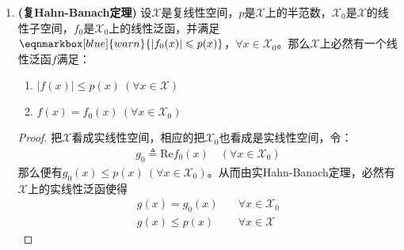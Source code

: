 \begin{enumerate}[leftmargin=2cm, label=\arabic*]
\begin{proof}
			于是$\mathscr{F}$成为一个半序集，又设$M$是$\mathscr{F}$中的任一个全序子集，令
			\begin{align*}
				\mathscr{X}_M \triangleq \bigcup\limits_{(\mathscr{X}_{\Delta},f_{\Delta})\in M} \{\mathscr{X}_{\Delta}\}
			\end{align*}
			以及
			\begin{align*}
				f_M(x) = f_{\Delta}(x),\quad \forall x\in\mathscr{X}_{\Delta},\ (\mathscr{X}_{\Delta},f_{\Delta})\in M
			\end{align*}
			由于$M$是全序子集，容易验证$\mathscr{X}$是包含$\mathscr{X}_0$的子空间，且$f_M$在$\mathscr{X}_M$上是唯一确定的，满足$f_M(x)\leqslant p(x)$，于是$(\mathscr{X}_M,f_M)\in\mathscr{F}$并且是$M$的一个上界。由Zorn引理，$\mathscr{F}$本身存在极大元，记为$(\mathscr{X}_A,f_A)$。
			
			最后我们证明$\mathscr{X}_A = \mathscr{X}$，用反证法，若不然则可以构造出$(\Tilde{\mathscr{X}}_A,\Tilde{f}_A)\in\mathscr{F}$，与极大性矛盾。故而所求的$f$即为$f_A$。
		\end{proof}
		\item \textbf{(复Hahn-Banach定理)} 设$\mathscr{X}$是复线性空间，$p$是$\mathscr{X}$上的半范数，$\mathscr{X}_0$是$\mathscr{X}$的线性子空间，$f_0$是$\mathscr{X}_0$上的线性泛函，并满足$\eqnmarkbox[blue]{warn}{|f_0(x)| \leqslant p(x)}$，$\forall x\in \mathscr{X}_0$。那么$\mathscr{X}$上必然有一个线性泛函$f$满足：
		\vspace{1em}
		
		\begin{enumerate}[leftmargin=1cm, label=(\arabic*)]
			\item $|f(x)|\leqslant p(x)\ (\forall x\in\mathscr{X})$
			\item $f(x) = f_0(x)\ (\forall x\in\mathscr{X}_0)$
		\end{enumerate}
		\begin{proof}
			把$\mathscr{X}$看成实线性空间，相应的把$\mathscr{X}_0$也看成是实线性空间，令：
			\begin{align*}
				g_0\triangleq \text{Re} f_0(x) \quad (\forall x\in\mathscr{X}_0)
			\end{align*}
			那么便有$g_0(x)\leqslant p(x)\ (\forall x\in\mathscr{X}_0)$。从而由实Hahn-Banach定理，必然有$\mathscr{X}$上的实线性泛函使得
			\begin{align*}
				g(x) = g_0(x) &\quad \forall x\in\mathscr{X}_0 \\
				g(x) \leqslant p(x) &\quad \forall x\in\mathscr{X}
			\end{align*}
			

\end{proof}
\end{enumerate}
